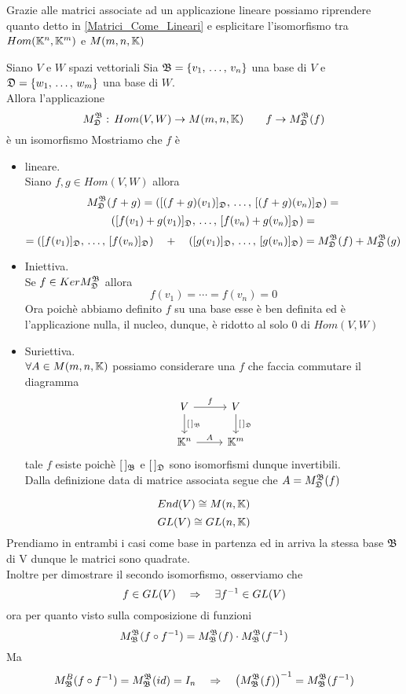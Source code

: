 \newpage
Grazie alle matrici associate ad un applicazione lineare possiamo  riprendere quanto detto in \ref{Matrici_Come_Lineari} e esplicitare l'isomorfismo tra $Hom(\mathbb{K}^n , \mathbb{K}^m ) $ e $M(m,n,\mathbb{K})$
\begin{thm}[$ \AB $ \`e un isomorfismo ] 
Siano $V$ e $W$ spazi vettoriali 
Sia $ \mathfrak{B} =\{ v_1, \, \dots , \, v_n \} $ una base di $V$ e  $ \mathfrak{D} =\{ w_1, \, \dots , \, w_m \} $ una base di $W$.\\
Allora l'applicazione
$$ M_{\mathfrak{D}} ^{\mathfrak{B}} :\, Hom (V ,W ) \to M ( m,n, \mathbb{K} ) \qquad f \to M_{\mathfrak{D}} ^{\mathfrak{B}} (f) $$
\`e un isomorfismo
\proof
Mostriamo che $f$ \`e
\begin{itemize}
\item lineare.\\
Siano $f,g \in Hom (V,W ) $ allora
$$ M_{\mathfrak{D}} ^{\mathfrak{B}} ( f+g) = ( [ (f+g)(v_1) ]_{\mathfrak{D}} , \, \dots , \,  [ (f+g)(v_n) ]_{\mathfrak{D}} ) =$$
$$  ( [ f(v_1)+g(v_1) ]_{\mathfrak{D}} , \, \dots , \,  [ f(v_n) + g (v_n) ]_{\mathfrak{D}} ) =
$$
$$ = ( [f(v_1)]_{\mathfrak{D}} , \, \dots , \, [f(v_n)]_{\mathfrak{D}} )\quad + \quad ( [g(v_1)]_{\mathfrak{D}} , \, \dots , \, [g(v_n)]_{\mathfrak{D}} )= M_{\mathfrak{D}} ^{\mathfrak{B}} ( f) + M_{\mathfrak{D}} ^{\mathfrak{B}} (g) $$
\item Iniettiva.\\
Se $f \in Ker M_{\mathfrak{D}} ^{\mathfrak{B}} $ allora
$$ f(v_1)= \cdots = f(v_n ) = 0 $$ 
Ora poich\`e abbiamo definito $f$ su una base esse \`e ben definita ed \`e l'applicazione nulla, il nucleo, dunque, \`e ridotto al solo $0$ di $Hom(V,W)$
\item Suriettiva.\\
$\forall A \in M(m,n,\mathbb{K})$ possiamo considerare una $f$ che faccia commutare il diagramma 
$$ \begin{tikzcd} V \arrow[r,"f"] \arrow{d}{[\, ]_\B} & V \arrow{d}{[\,]_\D} \\ \K^n \arrow[r,"A"] & \K^m
\end{tikzcd} $$
tale $f$ esiste poich\`e $[\,]_{\mathfrak{B}}$ e $[\,]_{\mathfrak{D}}$ sono isomorfismi dunque invertibili.\\
Dalla definizione data di matrice associata segue che $A=M_{\mathfrak{D}} ^{\mathfrak{B}} (f) $
\end{itemize}
\endproof
\end{thm}
\spazio
\begin{cor}$$ End (V) \cong M(n,\mathbb{K})$$
$$ GL(V)\cong GL(n,\mathbb{K})$$
\proof
Prendiamo in entrambi i casi come base in partenza ed in arriva la stessa base $\mathfrak{B}$ di V dunque le matrici sono quadrate.\\
Inoltre per dimostrare il secondo isomorfismo, osserviamo che
$$ f\in GL(V) \quad \Rightarrow \quad \exists f^{-1} \in GL(V)$$ 
ora per quanto visto sulla composizione di funzioni
$$M_{\mathfrak{B}}^{\mathfrak{B}} (f \circ f^{-1}) = M_{\mathfrak{B}}^{\mathfrak{B}} (f) \cdot M_{\mathfrak{B}}^{\mathfrak{B}}(f^{-1} )$$
Ma $$M_{\mathfrak{B}}^B (f\circ f^{-1}) = M_{\mathfrak{B}}^{\mathfrak{B}} (id) = I_n  \quad \Rightarrow \quad 
 \left( M_{\mathfrak{B}}^{\mathfrak{B}}(f) \right)^{-1} = M_{\mathfrak{B}}^{\mathfrak{B}} (f^{-1})$$
\endproof \end{cor}
\newpage

